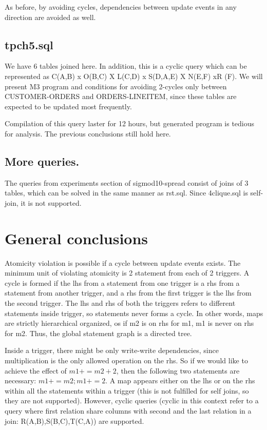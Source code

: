 \documentclass{sig-semester}
\begin{document}
As before, by avoiding cycles, dependencies between update events in any direction are avoided as well.

\subsection{tpch5.sql} We have 6 tables joined here. In addition, this is a cyclic query which can be represented as C(A,B) x O(B,C) X L(C,D) x S(D,A,E) X N(E,F) xR (F). We will present M3 program and conditions for avoiding 2-cycles only between CUSTOMER-ORDERS and ORDERS-LINEITEM, since these tables are expected to be updated most frequently.

Compilation of this query laster for 12 hours, but generated program is tedious for analysis. The previous conclusions still hold here.

\subsection{More queries.}
The queries from experiments section of sigmod10-spread consist of joins of 3 tables, which can be solved in the same manner as rst.sql. Since 4clique.sql is self-join, it is not supported.

\section{General conclusions}
\vspace{2mm}
Atomicity violation is possible if a cycle between update events exists. The minimum unit of violating atomicity is 2 statement from each of 2 triggers. A cycle is formed if the lhs from a statement from one trigger is a rhs from a statement from another trigger, and a rhs from the first trigger is the lhs from the second trigger. The lhs and rhs of both the triggers refers to different statements inside trigger, so statements never forms a cycle. In other words, maps are strictly hierarchical organized, os if m2 is on rhs for m1, m1 is never on rhs for m2. Thus, the global statement graph is a directed tree.

Inside a trigger, there might be only write-write dependencies, since multiplication is the only allowed operation on the rhs. So if we would like to achieve the effect of $m1+=m2+2$, then the following two statements are necessary: $m1+=m2; m1+=2$. A map appears either on the lhs or on the rhs within all the statements within a trigger (this is not fulfilled for self joins, so they are not supported). However, cyclic queries (cyclic in this context refer to a query where first relation share columns with second and the last relation in a join: R(A,B),S(B,C),T(C,A)) are supported.
\end{document}
